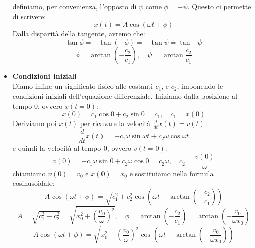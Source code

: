 \documentclass[a4paper,12pt]{article}
\begin{document}
\begin{itemize}
definiamo, per convenienza, l'opposto di $\psi$ come $\phi = -\psi$. Questo ci permette di scrivere:
$$ x(t) = A\cos{(\omega t + \phi)} $$
Dalla disparità della tangente, avremo
che:
$$ \tan{\phi} = -\tan{(-\phi)} = -\tan{\psi} = \tan{-\psi} $$
$$ \phi = \arctan{(-\frac{c_2}{c_1})}, \quad \psi = \arctan{\frac{c_2}{c_1}} $$
  \item \textbf{Condizioni iniziali} \\
Diamo infine un significato fisico alle costanti $c_1$, e $c_2$, imponendo le condizioni iniziali dell'equazione differenziale.
Iniziamo dalla posizione al tempo 0, ovvero $x(t = 0)$:
$$ x(0) = c_1\cos{0} + c_2\sin{0} = c_1, \quad c_1 = x(0) $$
Deriviamo poi $x(t)$ per ricavare la velocità $\frac{d}{dt}x(t) = v(t)$:
$$ \frac{d}{dt}x(t) = -c_1\omega\sin{\omega t} + c_2\omega\cos{\omega t} $$
e quindi la velocità al tempo 0, ovvero $v(t = 0)$:
$$ v(0) = -c_1\omega\sin{0} + c_2\omega\cos{0} = c_2\omega, \quad c_2 = \frac{v(0)}{\omega} $$
chiamiamo $v(0) = v_0$ e $x(0) = x_0$ e sostituiamo nella formula cosinusoidale:
$$ A\cos{(\omega t + \phi)} = \sqrt{c_1^2 + c_2^2}\cos{(\omega t + \arctan{(-\frac{c_2}{c_1})})} $$
$$ A = \sqrt{c_1^2+c_2^2} = \sqrt{x_0^2 + (\frac{v_0}{\omega})^2}, \quad \phi = \arctan{(-\frac{c_2}{c_1})} = \arctan{(-\frac{v_0}{\omega x_0})} $$
$$ A\cos{(\omega t + \phi)} = \sqrt{x_0^2 + (\frac{v_0}{\omega})^2}\cos{(\omega t + \arctan{(-\frac{v_0}{\omega x_0})})} $$
\end{itemize}
\end{document}
